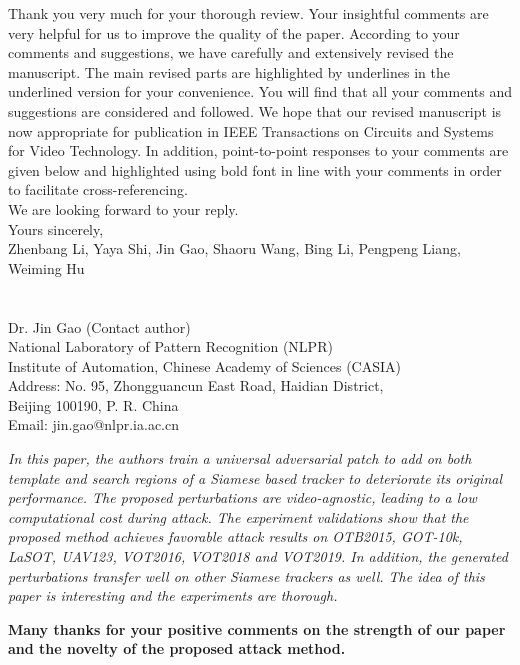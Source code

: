 \documentclass[12pt]{article}
\begin{document}
Thank you very much for your thorough review. Your insightful comments are very helpful for us to improve the quality of the paper. According to your comments and suggestions, we have carefully and extensively revised the manuscript. The main revised parts are highlighted by underlines in the underlined version for your convenience. You will find that all your comments and suggestions are considered and followed. We hope that our revised manuscript is now appropriate for publication in IEEE Transactions on Circuits and Systems for Video Technology.
In addition, point-to-point responses to your comments are given below and highlighted using bold font in line with your comments in order to facilitate cross-referencing.\\[10pt]
\indent We are looking forward to your reply.\\[10pt]
\noindent Yours sincerely,\\
\noindent Zhenbang Li, Yaya Shi, Jin Gao, Shaoru Wang, Bing Li, Pengpeng Liang, Weiming Hu
\\
\\
\\
\noindent Dr. Jin Gao (Contact author)\\
\noindent National Laboratory of Pattern Recognition (NLPR)\\
\noindent Institute of Automation, Chinese Academy of Sciences (CASIA)\\
\noindent Address: No. 95, Zhongguancun East Road, Haidian District,\\
\noindent Beijing 100190, P. R. China\\
\noindent Email: jin.gao@nlpr.ia.ac.cn

\newpage
\textit{In this paper, the authors train a universal adversarial patch to add on both template and search regions of a Siamese based tracker to deteriorate its original performance. The proposed perturbations are video-agnostic, leading to a low computational cost during attack. The experiment validations show that the proposed method achieves favorable attack results on OTB2015, GOT-10k, LaSOT, UAV123, VOT2016, VOT2018 and VOT2019. In addition, the generated perturbations transfer well on other Siamese trackers as well. The idea of this paper is interesting and the experiments are thorough.}

\textbf{Many thanks for your positive comments on the strength of our paper and the novelty of the proposed attack method.}
\end{document}
